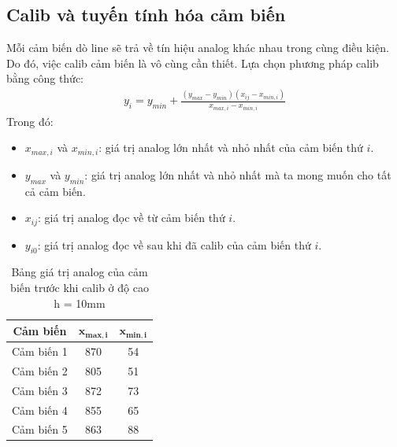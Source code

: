         \subsection{Calib và tuyến tính hóa cảm biến}
            \hspace*{0.6cm}Mỗi cảm biến dò line sẽ trả về tín hiệu analog khác nhau trong cùng điều kiện. Do đó, việc calib cảm biến là vô cùng cần thiết. Lựa chọn phương pháp calib bằng công thức:
            \begin{align}
                y_i = y_{min} + \frac{(y_{max} - y_{min})(x_{ij} - x_{min, i})}{x_{max, i} - x_{min, i}} 
                \label{eq:4-6}
            \end{align}
            \hspace*{0.6cm}Trong đó:
            \begin{itemize}
                \item $x_{max,i}$ và $x_{min,i}$: giá trị analog lớn nhất và nhỏ nhất của cảm biến thứ $i$.
                \item $y_{max}$ và $y_{min}$: giá trị analog lớn nhất và nhỏ nhất mà ta mong muốn cho tất cả cảm biến.
                \item $x_{ij}$: giá trị analog đọc về từ cảm biến thứ $i$.
                \item $y_{i0}$: giá trị analog đọc về sau khi đã calib của cảm biến thứ $i$.
            \end{itemize}
            \begin{table}[H]
                \centering
                \caption{Bảng giá trị analog của cảm biến trước khi calib ở độ cao h = 10mm}
                \label{tab:4-4}
                \begin{tabular}{|c|c|c|}
                    \hline
                    \textbf{Cảm biến} & $\mathbf{x_{max,i}}$ & $\mathbf{x_{min,i}}$  \\
                    \hline
                    Cảm biến 1 & 870 & 54  \\
                    \hline
                    Cảm biến 2 & 805 & 51  \\
                    \hline
                    Cảm biến 3 & 872 & 73  \\
                    \hline
                    Cảm biến 4 & 855 & 65  \\
                    \hline
                    Cảm biến 5 & 863 & 88  \\
                    \hline
                \end{tabular}
            \end{table}

